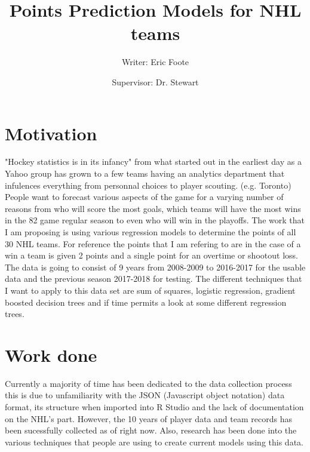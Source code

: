 \documentclass{article}
\begin{document}
	\title{Points Prediction Models for NHL teams}
	\author{Writer: Eric Foote}
	\maketitle
	\author{Supervisor: Dr. Stewart}
	\newpage
	\section{Motivation}
	"Hockey statistics is in its infancy"\cite{Weissbock} from what started out in the earliest day as a Yahoo group\cite{Vollman} has grown to a few teams having an analytics department that infulences everything from personnal choices to player scouting. (e.g. Toronto) People want to forecast various aspects of the game for a varying number of reasons from who will score the most goals, which teams will have the most wins in the 82 game regular season to even who will win in the playoffs. The work that I am proposing is using various regression models to determine the points of all 30 NHL teams. For reference the points that I am refering to are in the case of a win a team is given 2 points and a single point for an overtime or shootout loss. The data is going to consist of 9 years from 2008-2009 to 2016-2017 for the usable data and the previous season 2017-2018 for testing. The different techniques that I want to apply to this data set are sum of squares, logistic regression, gradient boosted decision trees and if time permits a look at some different regression trees.
	\section{Work done}
	Currently a majority of time has been dedicated to the data collection process this is due to unfamiliarity with the JSON (Javascript object notation) data format, its structure when imported into R Studio and the lack of documentation on the NHL's part. However, the 10 years of player data and team records has been sucessfully collected as of right now. Also, research has been done into the various techniques that people are using to create current models using this data.  
\end{document}
